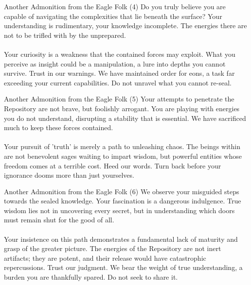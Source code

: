 \documentclass[a4paper,12pt]{article}
\begin{document}
\begin{biginfobox}{Another Admonition from the Eagle Folk (4)}
Do you truly believe you are capable of navigating the complexities that lie beneath the surface? Your understanding is rudimentary, your knowledge incomplete. The energies there are not to be trifled with by the unprepared. \\
\\
Your curiosity is a weakness that the contained forces may exploit. What you perceive as insight could be a manipulation, a lure into depths you cannot survive. Trust in our warnings. We have maintained order for eons, a task far exceeding your current capabilities. Do not unravel what you cannot re-seal.
\end{biginfobox}

\begin{biginfobox}{Another Admonition from the Eagle Folk (5)}
Your attempts to penetrate the Repository are not brave, but foolishly arrogant. You are playing with energies you do not understand, disrupting a stability that is essential. We have sacrificed much to keep these forces contained. \\
\\
Your pursuit of 'truth' is merely a path to unleashing chaos. The beings within are not benevolent sages waiting to impart wisdom, but powerful entities whose freedom comes at a terrible cost. Heed our words. Turn back before your ignorance dooms more than just yourselves.
\end{biginfobox}

\begin{biginfobox}{Another Admonition from the Eagle Folk (6)}
We observe your misguided steps towards the sealed knowledge. Your fascination is a dangerous indulgence. True wisdom lies not in uncovering every secret, but in understanding which doors must remain shut for the good of all. \\
\\
Your insistence on this path demonstrates a fundamental lack of maturity and grasp of the greater picture. The energies of the Repository are not inert artifacts; they are potent, and their release would have catastrophic repercussions. Trust our judgment. We bear the weight of true understanding, a burden you are thankfully spared. Do not seek to share it.
\end{biginfobox}
\end{document}
